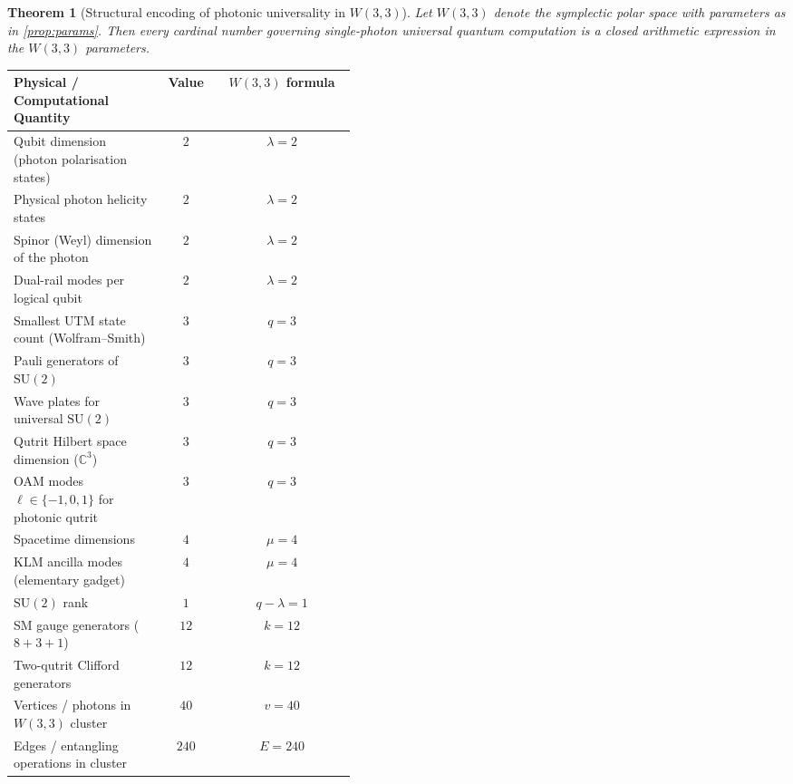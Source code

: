 ﻿\documentclass[12pt]{article}
\newtheorem{theorem}{Theorem}[section]
\newcommand{\CC}{\mathbb{C}}
\begin{document}
\begin{theorem}[Structural encoding of photonic universality in $W(3,3)$]
\label{thm:encoding}
Let $W(3,3)$ denote the symplectic polar space with parameters as in
\cref{prop:params}.  Then every cardinal number governing single-photon universal
quantum computation is a closed arithmetic expression in the $W(3,3)$ parameters.
\end{theorem}

\begin{center}
\renewcommand{\arraystretch}{1.18}
\begin{tabular}{@{}p{0.44\linewidth}cc@{}}
\toprule
\textbf{Physical / Computational Quantity} & \textbf{Value} & \textbf{$W(3,3)$ formula} \\
\midrule
Qubit dimension (photon polarisation states)       & $2$     & $\lambda = 2$ \\
Physical photon helicity states                    & $2$     & $\lambda = 2$ \\
Spinor (Weyl) dimension of the photon              & $2$     & $\lambda = 2$ \\
Dual-rail modes per logical qubit                  & $2$     & $\lambda = 2$ \\
Smallest UTM state count (Wolfram--Smith)          & $3$     & $q = 3$ \\
Pauli generators of $\mathrm{SU}(2)$              & $3$     & $q = 3$ \\
Wave plates for universal $\mathrm{SU}(2)$         & $3$     & $q = 3$ \\
Qutrit Hilbert space dimension ($\CC^3$)           & $3$     & $q = 3$ \\
OAM modes $\ell\in\{-1,0,1\}$ for photonic qutrit & $3$     & $q = 3$ \\
Spacetime dimensions                               & $4$     & $\mu = 4$ \\
KLM ancilla modes (elementary gadget)              & $4$     & $\mu = 4$ \\
$\mathrm{SU}(2)$ rank                             & $1$     & $q - \lambda = 1$ \\
SM gauge generators ($8+3+1$)                      & $12$    & $k = 12$ \\
Two-qutrit Clifford generators                     & $12$    & $k = 12$ \\
Vertices / photons in $W(3,3)$ cluster             & $40$    & $v = 40$ \\
Edges / entangling operations in cluster           & $240$   & $E = 240$ \\

\end{tabular}
\end{center}
\end{document}
